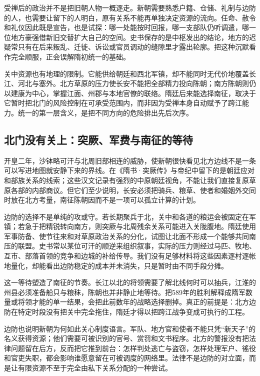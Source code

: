 受禅后的政治并不是把旧朝人物一概逐走。新朝需要熟悉户籍、仓储、礼制与边防的人，也需要让留下的人明白，原有关系不能再单独决定资源的流向。任命、赦令和礼仪因此既是宣告，也是试探：哪一处能按时回报，哪一支部队仍听调遣，哪一位地方豪强借新旧交替扩大自己的空间。史书保存的是中枢发出的结论，地方的迟疑常只有在后来叛乱、迁徙、诉讼或官员调动的缝隙里才露出轮廓。把这种沉默看作完全顺服，正会误解隋初统一的基础。

关中资源也有地理的限制。它能供给朝廷和西北军镇，却不能同时无代价地覆盖长江、河北与塞外。北方草原的压力使长安不能把全部精力投向陈朝；南方陈朝则仍以建康为中心，掌握江面、州郡与本地官僚的联络。隋廷后来能选择南征，取决于它暂时把北门的风险控制在可承受范围内，而非因为受禅本身自动赋予了跨江能力。统一的第一层含义，是把不同方向的危险排出先后次序。

\subsection{北门没有关上：突厥、军费与南征的等待}
开皇二年，沙钵略可汗与北周旧部相连的威胁，使新朝很快看见北方边线不是一条可以写进地图就安静下来的界线。在《隋书·突厥传》与帝纪中留下的是朝廷应对和部族关系的线索；这些汉文记录有强烈的中原朝廷视角，不能让我们直接复原草原各部的内部商议。但它们至少说明，长安必须把骑兵、粮草、使者和婚姻外交同时放在北方考量，南征陈朝因而不是一项可以孤立计算的计划。

边防的选择不是单纯的攻或守。若长期聚兵于北，关中和各道的粮运会被固定在军镇；若急于把精锐转向南方，则突厥与北周残余关系可能进入关陇腹地。隋廷使用军事防备、使节往来和对草原政治关系的分化，试图让北面不形成一个能够共同南压的联盟。史书常以某位可汗的顺逆来组织叙事，实际的压力则经过马匹、牧地、互市、部落首领的竞争和边城的补给传导。我们没有足够材料将这些因素逐村逐帐地量化，却能看出边防稳定的成本并未消失，只是暂时由不同手段分摊。

这一等待塑造了南征的节奏。长江以北的将领需要了解北线何时可以抽兵，江淮的州县必须准备船只与粮秣，陈朝也并非静止地等待。把589年的胜利解释成隋军数量或将领才能的单一结果，会把此前数年的战略选择删掉。真正的前提是：北方边防在特定时段没有把关中完全拖住，隋廷才得以把跨江战争变成可执行的工程。

边防也说明新朝为何如此关心制度语言。军队、地方官和使者不能只凭“新天子”的名义获得资源；他们需要可被识别的官号、赏罚和文书程序。北方的警报没有把法律问题留在后方，反而把它推到前台：怎样判处逃亡与盗窃，怎样处理军户、徭役和官吏失职，都会影响谁愿意留在可被调度的网络里。法律不是边防的对立面，而是让有限资源不至于完全由私下关系分配的一种尝试。

